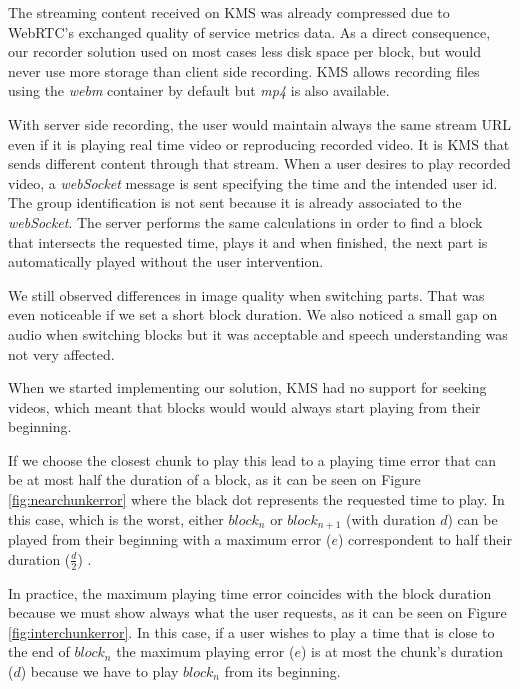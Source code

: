 The streaming content received on \ac{KMS} was already compressed due to \ac{WebRTC}'s exchanged quality of service metrics data. As a direct consequence, our recorder solution used on most cases less disk space per block, but would never use more storage than client side recording. \ac{KMS} allows recording files using the \emph{webm} container by default but \emph{mp4} is also available.

	With server side recording, the user would maintain always the same stream \ac{URL} even if it is playing real time video or reproducing recorded video. It is \ac{KMS} that sends different content through that stream. When a user desires to play recorded video, a \emph{webSocket} message is sent specifying the time and the intended user id. The group identification is not sent because it is already associated to the \emph{webSocket}. The server performs the same calculations in order to find a block that intersects the requested time, plays it and when finished, the next part is automatically played without the user intervention.

	We still observed differences in image quality when switching parts. That was even noticeable if we set a short block duration. We also noticed a small gap on audio when switching blocks but it was acceptable and speech understanding was not very affected. 

	When we started implementing our solution, \ac{KMS} had no support for seeking videos, which meant that blocks would would always start playing from their beginning. 

	If we choose the closest chunk to play this lead to a playing time error that can be at most half the duration of a block, as it can be seen on Figure \ref{fig:nearchunkerror} where the black dot represents the requested time to play. In this case, which is the worst, either $ block_{n}$ or $ block_{n+1}$ (with duration $d$) can be played from their beginning with a maximum error ($e$) correspondent to half their duration ($\frac{d}{2}$) . 


	In practice, the maximum playing time error coincides with the block duration because we must show always what the user requests, as it can be seen on Figure \ref{fig:interchunkerror}. In this case, if a user wishes to play a time that is close to the end of $block_n$ the maximum playing error ($e$) is at most the chunk's duration ($d$) because we have to play $block_n$ from its beginning.

